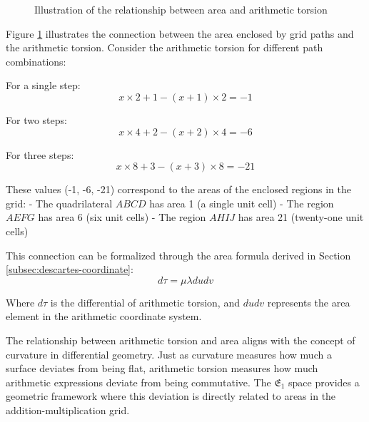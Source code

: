 \begin{figure}[ht]
    \centering
    \caption{Illustration of the relationship between area and arithmetic torsion}\label{fig:area-formula}
\end{figure}

Figure \ref{fig:area-formula} illustrates the connection between the area enclosed by grid paths and the arithmetic torsion. Consider the arithmetic torsion for different path combinations:

For a single step:
\begin{equation}
    x \times 2 + 1 - (x + 1) \times 2 = -1
\end{equation}

For two steps:
\begin{equation}
    x \times 4 + 2 - (x + 2) \times 4 = -6
\end{equation}

For three steps:
\begin{equation}
    x \times 8 + 3 - (x + 3) \times 8 = -21
\end{equation}

These values (-1, -6, -21) correspond to the areas of the enclosed regions in the grid:
- The quadrilateral $ABCD$ has area 1 (a single unit cell)
- The region $AEFG$ has area 6 (six unit cells)
- The region $AHIJ$ has area 21 (twenty-one unit cells)

This connection can be formalized through the area formula derived in Section \ref{subsec:descartes-coordinate}:
\begin{equation}
    d\tau = \mu \lambda du dv
\end{equation}

Where $d\tau$ is the differential of arithmetic torsion, and $du dv$ represents the area element in the arithmetic coordinate system.

The relationship between arithmetic torsion and area aligns with the concept of curvature in differential geometry. Just as curvature measures how much a surface deviates from being flat, arithmetic torsion measures how much arithmetic expressions deviate from being commutative. The $\mathfrak{E}_1$ space provides a geometric framework where this deviation is directly related to areas in the addition-multiplication grid.

